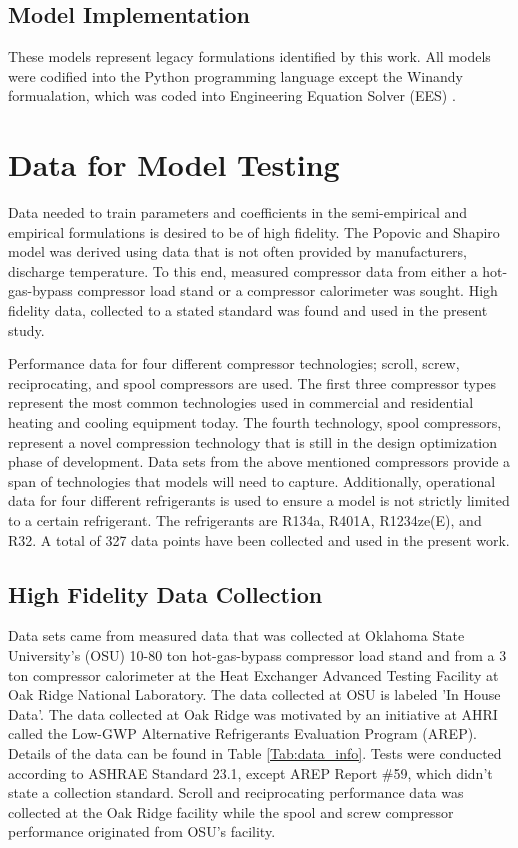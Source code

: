 \documentclass[preprint,11pt,authoryear]{elsarticle}
\begin{document}
\subsection{Model Implementation}

These models represent legacy formulations identified by this work. All models were codified into the Python programming language \citep{python} except the Winandy formualation, which was coded into Engineering Equation Solver (EES) \citep{ees}.

\section{Data for Model Testing}

Data needed to train parameters and coefficients in the semi-empirical and empirical formulations is desired to be of high fidelity. The Popovic and Shapiro model was derived using data that is not often provided by manufacturers, discharge temperature. To this end, measured compressor data from either a hot-gas-bypass compressor load stand or a compressor calorimeter was sought. High fidelity data, collected to a stated standard was found and used in the present study. 

Performance data for four different compressor technologies; scroll, screw, reciprocating, and spool compressors are used. The first three compressor types represent the most common technologies used in commercial and residential heating and cooling equipment today. The fourth technology, spool compressors, represent a novel compression technology that is still in the design optimization phase of development. Data sets from the above mentioned compressors provide a span of technologies that models will need to capture. Additionally, operational data for four different refrigerants is used to ensure a model is not strictly limited to a certain refrigerant. The refrigerants are R134a, R401A, R1234ze(E), and R32. A total of 327 data points have been collected and used in the present work.

\subsection{High Fidelity Data Collection}

Data sets came from measured data that was collected at Oklahoma State University's (OSU) 10-80 ton hot-gas-bypass compressor load stand and from a 3 ton compressor calorimeter at the Heat Exchanger Advanced Testing Facility at Oak Ridge National Laboratory. The data collected at OSU is labeled 'In House Data'. The data collected at Oak Ridge was motivated by an initiative at AHRI called the Low-GWP Alternative Refrigerants Evaluation Program (AREP). Details of the data can be found in Table \ref{Tab:data_info}. Tests were conducted according to ASHRAE Standard 23.1, except AREP Report \#59, which didn't state a collection standard. Scroll and reciprocating performance data was collected at the Oak Ridge facility while the spool and screw compressor performance originated from OSU's facility. 
\end{document}
